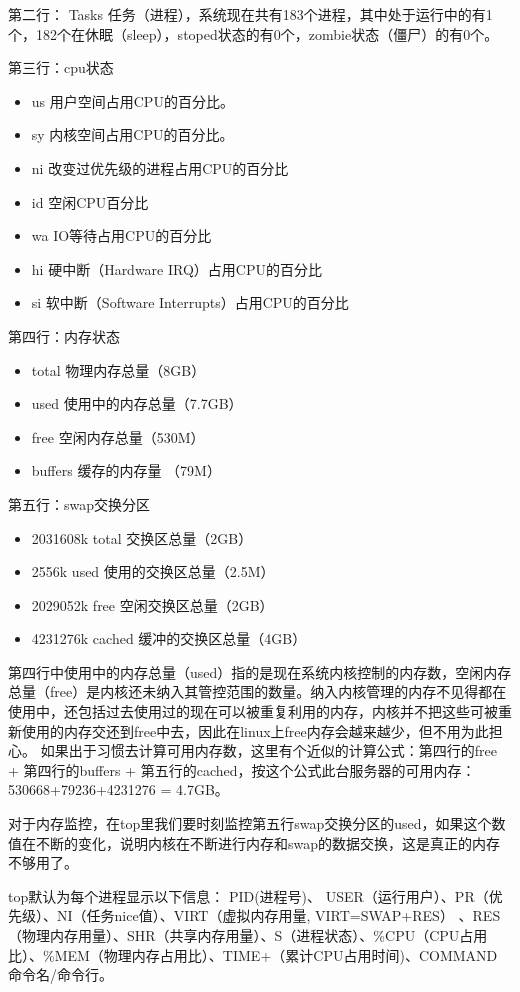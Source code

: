 第二行：
 Tasks 任务（进程），系统现在共有183个进程，其中处于运行中的有1个，182个在休眠（sleep），stoped状态的有0个，zombie状态（僵尸）的有0个。

第三行：cpu状态
\begin{itemize}
\item us 用户空间占用CPU的百分比。
\item sy 内核空间占用CPU的百分比。
\item ni 改变过优先级的进程占用CPU的百分比
\item id 空闲CPU百分比
\item wa IO等待占用CPU的百分比
\item hi 硬中断（Hardware IRQ）占用CPU的百分比
\item si 软中断（Software Interrupts）占用CPU的百分比
\end{itemize}

第四行：内存状态
\begin{itemize}
\item total 物理内存总量（8GB）
\item used 使用中的内存总量（7.7GB）
\item free 空闲内存总量（530M）
\item buffers 缓存的内存量 （79M）
\end{itemize}

第五行：swap交换分区
\begin{itemize}
\item  2031608k total 交换区总量（2GB）
\item  2556k used 使用的交换区总量（2.5M）
\item  2029052k free 空闲交换区总量（2GB）
\item  4231276k cached 缓冲的交换区总量（4GB）
\end{itemize}

第四行中使用中的内存总量（used）指的是现在系统内核控制的内存数，空闲内存总量（free）是内核还未纳入其管控范围的数量。纳入内核管理的内存不见得都在使用中，还包括过去使用过的现在可以被重复利用的内存，内核并不把这些可被重新使用的内存交还到free中去，因此在linux上free内存会越来越少，但不用为此担心。
如果出于习惯去计算可用内存数，这里有个近似的计算公式：第四行的free + 第四行的buffers + 第五行的cached，按这个公式此台服务器的可用内存：530668+79236+4231276 = 4.7GB。
  
对于内存监控，在top里我们要时刻监控第五行swap交换分区的used，如果这个数值在不断的变化，说明内核在不断进行内存和swap的数据交换，这是真正的内存不够用了。


top默认为每个进程显示以下信息：
PID(进程号)、 USER（运行用户）、PR（优先级）、NI（任务nice值）、VIRT（虚拟内存用量, VIRT=SWAP+RES） 、RES（物理内存用量）、SHR（共享内存用量）、S（进程状态）、\%CPU（CPU占用比）、\%MEM（物理内存占用比）、TIME+（累计CPU占用时间)、COMMAND 命令名/命令行。


